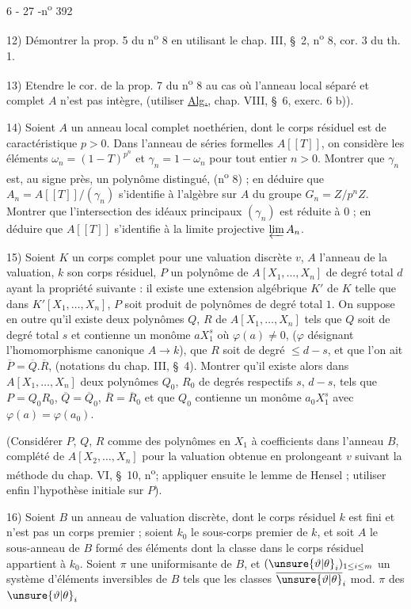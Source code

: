 \begin{center}6 - 27 -\hfill n\textsuperscript{o} 392\end{center}

12) Démontrer la prop. 5 du n\textsuperscript{o} 8 en utilisant le chap. III, \S\ 2, n\textsuperscript{o} 8, cor. 3 du th. 1.

13) Etendre le cor. de la prop. 7 du n\textsuperscript{o} 8 au cas où l'anneau local séparé et complet $A$ n'est pas intègre, (utiliser \uline{Alg.}, chap. VIII, \S\ 6, exerc. 6 b)).

14) Soient $A$ un anneau local complet noethérien, dont le corps résiduel est de caractéristique $p>0$. Dans l'anneau de séries formelles $A[[T]]$, on considère les éléments $\omega_n=(1-T)^{p^n}$ et $\gamma_n=1-\omega_n$ pour tout entier $n>0$. Montrer que $\gamma_n$ est, au signe près, un polynôme distingué, (n\textsuperscript{o} 8) ; en déduire que $A_n=A[[T]]/(\gamma_n)$ s'identifie à l'algèbre sur $A$ du groupe $G_n=Z/p^nZ$. Montrer que l'intersection des idéaux principaux $(\gamma_n)$ est réduite à $0$ ; en déduire que $A[[T]]$ s'identifie à la limite projective $\varprojlim A_n$.

15) Soient $K$ un corps complet pour une valuation discrète $v$, $A$ l'anneau de la valuation, $k$ son corps résiduel, $P$ un polynôme de $A[X_1,\ldots,X_n]$ de degré total $d$ ayant la propriété suivante : il existe une extension algébrique $K'$ de $K$ telle que dans $K'[X_1,\ldots,X_n]$, $P$ soit produit de polynômes de degré total $1$. On suppose en outre qu'il existe deux polynômes $Q$, $R$ de $A[X_1,\ldots,X_n]$ tels que $Q$ soit de degré total $s$ et contienne un monôme $aX_1^s$ où $\varphi(a)\ne 0$, ($\varphi$ désignant l'homomorphisme canonique $A\longrightarrow k$), que $R$ soit de degré $\leq d-s$, et que l'on ait $\overline{P}=\overline{Q}.\overline{R}$, (notations du chap. III, \S\ 4). Montrer qu'il existe alors dans $A[X_1,\ldots,X_n]$ deux polynômes $Q_0$, $R_0$ de degrés respectifs $s$, $d-s$, tels que $P=Q_0R_0$, $\overline{Q}=\overline{Q}_0$, $\overline{R}=\overline{R}_0$ et que $Q_0$ contienne un monôme $a_0X_1^s$ avec $\varphi(a)=\varphi(a_0)$.

(Considérer $P$, $Q$, $R$ comme des polynômes en $X_1$ à coefficients dans l'anneau $B$, complété de $A[X_2,\ldots,X_n]$ pour la valuation obtenue en prolongeant $v$ suivant la méthode du chap. VI, \S\ 10, n\textsuperscript{o}\quad ; appliquer ensuite le lemme de Hensel ; utiliser enfin l'hypothèse initiale sur $P$).

16) Soient $B$ un anneau de valuation discrète, dont le corps résiduel $k$ est fini et n'est pas un corps premier ; soient $k_0$ le sous-corps premier de $k$, et soit $A$ le sous-anneau de $B$ formé des éléments dont la classe dans le corps résiduel appartient à $k_0$. Soient $\pi$ une uniformisante de $B$, et $(\unsure{\vartheta|\theta}_i)_{1\leq i\leq m}$ un système d'éléments inversibles de $B$ tels que les classes $\overline{\unsure{\vartheta|\theta}}_i$ mod. $\pi$ des $\unsure{\vartheta|\theta}_i$


